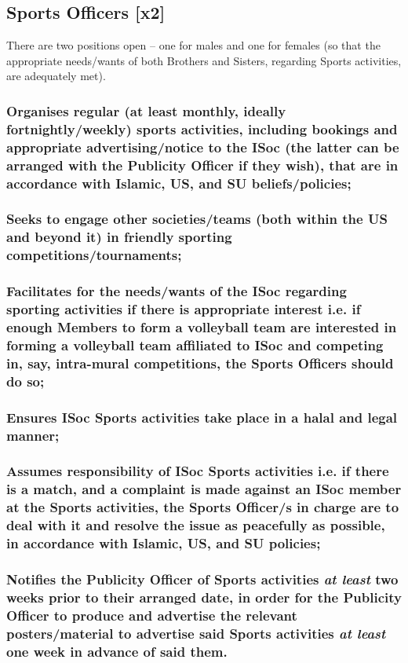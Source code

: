 \documentclass[12pt]{article}
\begin{document}
\subsection{Sports Officers [x2]}
There are two positions open -- one for males and one for females (so that the appropriate needs/wants of both Brothers and Sisters, regarding Sports activities, are adequately met).
\subsubsection{Organises regular (at least monthly, ideally fortnightly/weekly) sports activities, including bookings and appropriate advertising/notice to the ISoc (the latter can be arranged with the Publicity Officer if they wish), that are in accordance with Islamic, US, and SU beliefs/policies;}
\subsubsection{Seeks to engage other societies/teams (both within the US and beyond it) in friendly sporting competitions/tournaments;}
\subsubsection{Facilitates for the needs/wants of the ISoc regarding sporting activities if there is appropriate interest i.e. if enough Members to form a volleyball team are interested in forming a volleyball team affiliated to ISoc and competing in, say, intra-mural competitions, the Sports Officers should do so;}
\subsubsection{Ensures ISoc Sports activities take place in a halal and legal manner;}
\subsubsection{Assumes responsibility of ISoc Sports activities i.e. if there is a match, and a complaint is made against an ISoc member at the Sports activities, the Sports Officer/s in charge are to deal with it and resolve the issue as peacefully as possible, in accordance with Islamic, US, and SU policies;}
\subsubsection{Notifies the Publicity Officer of Sports activities \emph{at least} two weeks prior to their arranged date, in order for the Publicity Officer to produce and advertise the relevant posters/material to advertise said Sports activities \emph{at least} one week in advance of said them.}
\hspace{1pt}
\end{document}
